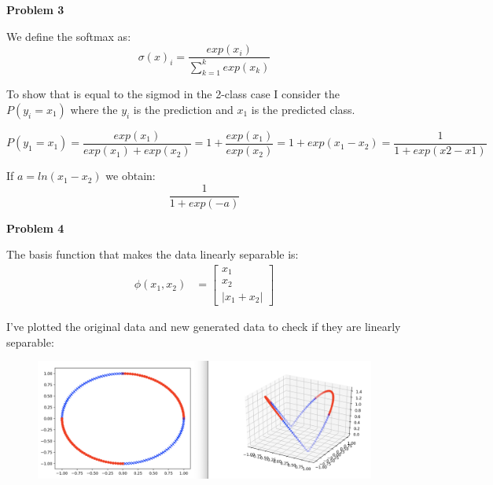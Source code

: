 \documentclass{article}
\begin{document}
\textbf{Problem 3}
\newline

We define the softmax as:
$$\sigma(x)_i = \frac{exp(x_i)}{\sum_{k=1}^k exp(x_k)}$$

To show that is equal to the sigmod in the 2-class case I consider the $P(y_i = x_1)$ where the $y_i$ is the prediction and $x_1$ is the predicted class.

$$P(y_1 = x_1) = \frac{exp(x_1)}{exp(x_1) + exp(x_2)} = 1 + \frac{exp(x_1)}{exp(x_2)}= 1 + exp(x_1 - x_2) = \frac{1}{1+exp(x2-x1)}$$

If $a = ln(x_1-x_2)$ we obtain:
$$\frac{1}{1+exp(-a)}$$

\textbf{Problem 4}
\newline

The basis function that makes the data linearly separable is:\begin{align}
    \phi(x_1,x_2) &= \begin{bmatrix}
           x_1 \\
           x_2 \\
           |x_1 + x_2|
         \end{bmatrix}
  \end{align}

I've plotted the original data and new generated data to check if they are linearly separable:

\begin{figure}[H]
\centering
  \includegraphics[width=\linewidth]{Exercise4.png}
\end{figure}
\end{document}
